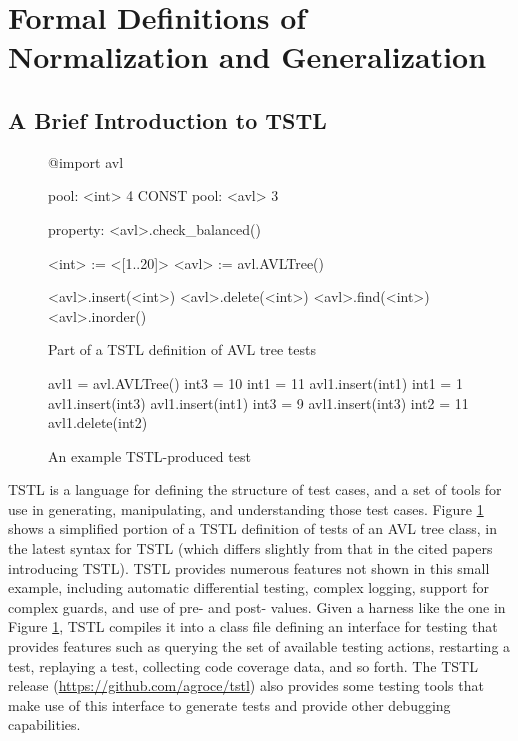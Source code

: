 \section{Formal Definitions of Normalization and Generalization}

\subsection{A Brief Introduction to TSTL}

\begin{figure}
{\scriptsize
\begin{code}
@import avl

pool: <int> 4 CONST
pool: <avl> 3

property: <avl>.check\_balanced()

<int> := <[1..20]>
<avl> := avl.AVLTree()

<avl>.insert(<int>)
<avl>.delete(<int>)
<avl>.find(<int>)
<avl>.inorder()
\end{code}
}
\caption{Part of a TSTL definition of AVL tree tests}
\label{fig:example}
\end{figure}

\begin{figure}
{\scriptsize
\begin{code}
avl1 = avl.AVLTree()  
int3 = 10  
int1 = 11  
avl1.insert(int1) 
int1 = 1  
avl1.insert(int3) 
avl1.insert(int1) 
int3 = 9  
avl1.insert(int3) 
int2 = 11  
avl1.delete(int2) 
\end{code}
}
\caption{An example TSTL-produced test}
\label{fig:avlrun}
\end{figure}

TSTL \cite{NFM15,ISSTA15} is a language for defining the structure of
test cases, and a set of tools for use in generating, manipulating,
and understanding those test cases.  Figure \ref{fig:example} shows a
simplified portion of a TSTL definition of tests of an AVL tree class,
in the latest syntax for TSTL (which differs slightly from that in the
cited papers introducing TSTL).  TSTL provides numerous features not
shown in this small example, including automatic differential testing,
complex logging, support for complex guards, and use of pre- and post-
values.  Given a harness like the one in Figure \ref{fig:example},
TSTL compiles it into a class file defining an interface for testing
that provides features such as querying the set of available testing
actions, restarting a test, replaying a test, collecting code coverage
data, and so forth.  The TSTL release
(\url{https://github.com/agroce/tstl}) also provides some testing
tools that make use of this interface to generate tests and provide
other debugging capabilities.

